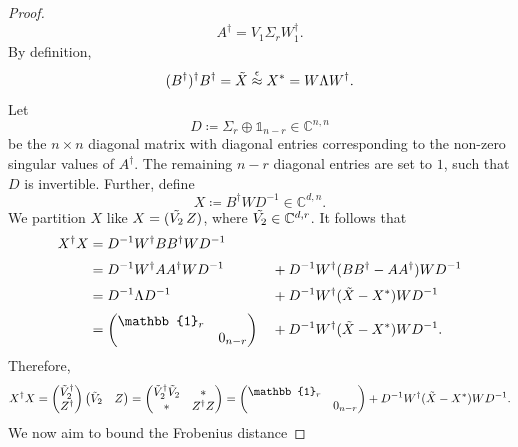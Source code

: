 \begin{proof}
\begin{equation*}
A^{\dag}=V_1\Sigma_r W_1^{\dag}.
\end{equation*}
By definition,
\begin{equation*}
(B^{\dag})^{\dag}B^{\dag}=\Tilde{X}\stackrel{\epsilon}{\approx}X^*=W\Lambda W^{\dag}.
\end{equation*}
Let 
\begin{equation*}
D\coloneqq\Sigma_r\oplus\mathbb{1}_{n-r}\in\mathbb{C}^{n,n}
\end{equation*} be the $n\times n$ diagonal matrix with diagonal entries corresponding to the non-zero singular values of $A^{\dag}$. The remaining $n-r$ diagonal entries are set to $1$, such that $D$ is invertible. Further, define
\begin{equation*}
X\coloneqq B^{\dag} W D^{-1}\in\mathbb{C}^{d,n}.
\end{equation*}
We partition $X$ like $X=(\Tilde{V_2}\thinspace Z)$, where $\Tilde{V_2}\in\mathbb{C}^{d,r}$.
It follows that
\begin{alignat*}{2}
X^{\dag}X & = D^{-1}W^{\dag}BB^{\dag}WD^{-1} && \\[0.2em]
& = D^{-1}W^{\dag}AA^{\dag}WD^{-1} && +D^{-1}W^{\dag}(BB^{\dag}-AA^{\dag})WD^{-1} \\[0.2em]
& = D^{-1}\Lambda D^{-1} && + D^{-1}W^{\dag}(\Tilde{X}-X^*)WD^{-1} \\[0.2em]
& =
\begin{pmatrix}
\mathbb{1}_r & \\
& 0_{n-r}
\end{pmatrix} && + D^{-1}W^{\dag}(\Tilde{X}-X^*)WD^{-1}.
\end{alignat*}
Therefore,
\begin{equation*}
X^{\dag}X=
\begin{pmatrix}
\Tilde{V}_2^{\dag}\\
Z^{\dag}
\end{pmatrix}
\begin{pmatrix}
\Tilde{V}_2 & Z
\end{pmatrix} =
\begin{pmatrix}
\Tilde{V}_2^{\dag}\Tilde{V}_2 & * \\
* & Z^{\dag}Z
\end{pmatrix}
= 
\begin{pmatrix}
\mathbb{1}_r & \\
& 0_{n-r}
\end{pmatrix} + D^{-1}W^{\dag}(\Tilde{X}-X^*)WD^{-1}.
\end{equation*}
We now aim to bound the Frobenius distance

\end{proof}
